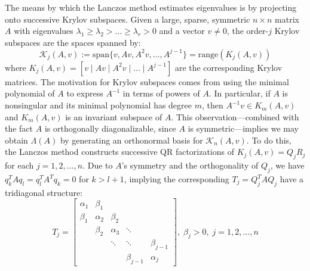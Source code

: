 \documentclass[10pt]{article}
\newcommand{\+}{%
	\raisebox{0.18ex}{\scaleobj{0.55}{+}}
}
\theoremstyle{definition}
\begin{document}
The means by which the Lanczos method estimates eigenvalues is by projecting onto successive Krylov subspaces. Given a large, sparse, symmetric $n \times n$ matrix $A$ with eigenvalues $\lambda_1 \geq \lambda_2 > \dots \geq \lambda_r > 0$ and a vector $v \neq 0$, the order-$j$ Krylov subspaces are the spaces spanned by: 
\begin{equation}
	\mathcal{K}_j(A, v) := \mathrm{span}\{ v, Av, A^2 v, \dots, A^{j-1} \} = \mathrm{range}(K_j(A, v))
\end{equation}
where $K_j(A, v) = [ v \mid Av \mid A^2 v \mid \dots \mid A^{j-1}]$ are the corresponding Krylov matrices. 
The motivation for Krylov subspaces comes from using the minimal polynomial of $A$ to express $A^{-1}$ in terms of powers of $A$. In particular, if $A$ is nonsingular and its minimal polynomial has degree $m$, then $A^{-1}v \in K_m(A, v)$ and $K_m(A, v)$ is an invariant subspace of $A$.
This observation---combined with the fact $A$ is orthogonally diagonalizable, since $A$ is symmetric---implies we may obtain $\Lambda(A)$ by generating an orthonormal basis for $\mathcal{K}_n(A, v)$. 
To do this, the Lanczos method constructs successive QR factorizations of $K_j(A,v) = Q_j R_j$ for each $j = 1, 2, \dots, n$.
Due to $A$'s symmetry and the orthogonality of $Q_j$, we have $q_k^T A q_l = q_l^T A^T q_k = 0$ for $k > l + 1$, implying the corresponding $T_j = Q_j^T A Q_j$ have a tridiagonal structure:
\begin{equation}
	T_j = \begin{bmatrix} 
	\alpha_1 & \beta_1 & & & \\
	\beta_1 & \alpha_2 & \beta_2 & & \\
	 & \beta_2 & \alpha_3 & \ddots & \\
	& & \ddots & \ddots & \beta_{j-1} \\
	& & & \beta_{j-1} & \alpha_{j} 
	\end{bmatrix}, \; \beta_j > 0, \; j = 1, 2, \dots, n
\end{equation}
\end{document}
